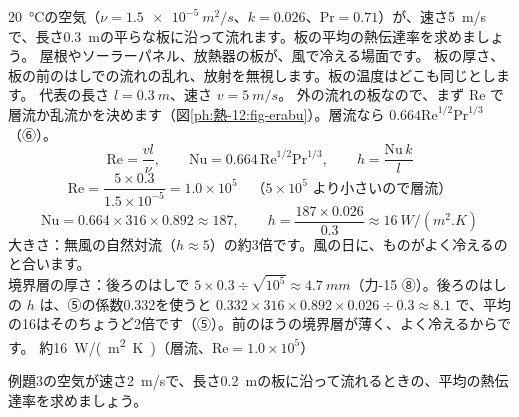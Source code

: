 \label{ph:熱-12:ex3}
\begin{phreidai}[風が板に沿って流れる]
\qty{20}{\celsius}の空気（$\nu=\qty{1.5e-5}{m^2/s}$、$k=0.026$、$\mathrm{Pr}=0.71$）が、速さ\qty{5}{m/s}で、長さ\qty{0.3}{m}の平らな板に沿って流れます。板の平均の熱伝達率を求めましょう。
\phbamen
屋根やソーラーパネル、放熱器の板が、風で冷える場面です。
\phmushi
板の厚さ、板の前のはしでの流れの乱れ、放射を無視します。板の温度はどこも同じとします。
\phzu
代表の長さ $l=\qty{0.3}{m}$、速さ $v=\qty{5}{m/s}$。
\phriyu
外の流れの板なので、まず Re で層流か乱流かを決めます（図\ref{ph:熱-12:fig-erabu}）。層流なら $0.664\mathrm{Re}^{1/2}\mathrm{Pr}^{1/3}$（⑥）。
\phtateru
\[\mathrm{Re}=\frac{vl}{\nu},\qquad\mathrm{Nu}=0.664\,\mathrm{Re}^{1/2}\mathrm{Pr}^{1/3},\qquad h=\frac{\mathrm{Nu}\,k}{l}\]
\phtoku
\[\mathrm{Re}=\frac{5\times0.3}{1.5\times10^{-5}}=1.0\times10^5\quad\text{（$5\times10^5$ より小さいので層流）}\]
\[\mathrm{Nu}=0.664\times316\times0.892\approx187,\qquad h=\frac{187\times0.026}{0.3}\approx\qty{16}{W/(m^2.K)}\]
\phtashikame
大きさ：無風の自然対流（$h\approx5$）の約3倍です。風の日に、ものがよく冷えるのと合います。\\
境界層の厚さ：後ろのはしで $5\times0.3\div\sqrt{10^5}\approx\qty{4.7}{mm}$（力-15 ⑧）。後ろのはしの $h$ は、⑤の係数0.332を使うと $0.332\times316\times0.892\times0.026\div0.3\approx8.1$ で、平均の16はそのちょうど2倍です（⑤）。前のほうの境界層が薄く、よく冷えるからです。
\kotae 約\qty{16}{W/(m^2.K)}（層流、$\mathrm{Re}=1.0\times10^5$）
\end{phreidai}
\begin{jibun}
例題3の空気が速さ\qty{2}{m/s}で、長さ\qty{0.2}{m}の板に沿って流れるときの、平均の熱伝達率を求めましょう。
\end{jibun}

